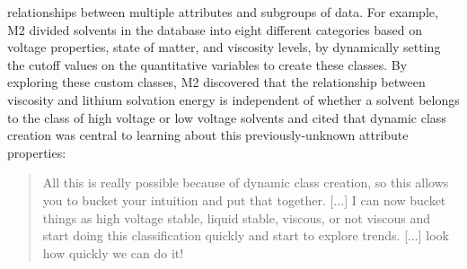 relationships between multiple attributes and subgroups of data. 
For example, M2 divided solvents in the database 
into eight different categories based on voltage properties, 
state of matter, and viscosity levels, 
by dynamically setting the cutoff values 
on the quantitative variables to create these classes. 
By exploring these custom classes, M2 discovered that the relationship between viscosity and lithium solvation energy is independent of whether a solvent belongs to the class of high voltage or low voltage solvents and cited that dynamic class creation was central to learning about this previously-unknown attribute properties:
\begin{quote}
All this is really possible because of dynamic class creation, so this allows you to bucket your intuition and put that together. [...] I can now bucket things as high voltage stable, liquid stable, viscous, or not viscous and start doing this classification quickly and start to explore trends. [...] look how quickly we can do it!%
\end{quote}
